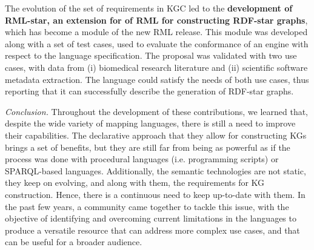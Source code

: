 \begin{itemize}
    The evolution of the set of requirements in KGC led to the \textbf{development of RML-star, an extension for of RML for constructing RDF-star graphs}, which has become a module of the new RML release. 
    This module was developed along with a set of test cases, used to evaluate the conformance of an engine with respect to the language specification. 
    The proposal was validated with two use cases, with data from (i) biomedical research literature and (ii) scientific software metadata extraction. 
    The language could satisfy the needs of both use cases, thus reporting that it can successfully describe the generation of RDF-star graphs. 
    
    \textit{Conclusion.} Throughout the development of these contributions, we learned that, despite the wide variety of mapping languages, there is still a need to improve their capabilities. The declarative approach that they allow for constructing KGs brings a set of benefits, but they are still far from being as powerful as if the process was done with procedural languages (i.e. programming scripts) or SPARQL-based languages. Additionally, the semantic technologies are not static, they keep on evolving, and along with them, the requirements for KG construction. Hence, there is a continuous need to keep up-to-date  with them. In the past few years, a community came together to tackle this issue, with the objective of identifying and overcoming current limitations in the languages to produce a versatile resource that can address more complex use cases, and that can be useful for a broader audience. %
\end{itemize}


